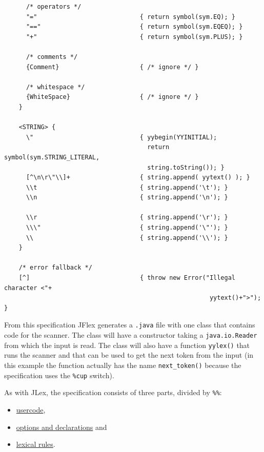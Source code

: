 \begin{verbatim}
      /* operators */
      "="                            { return symbol(sym.EQ); }
      "=="                           { return symbol(sym.EQEQ); }
      "+"                            { return symbol(sym.PLUS); }

      /* comments */
      {Comment}                      { /* ignore */ }
     
      /* whitespace */
      {WhiteSpace}                   { /* ignore */ }
    }

    <STRING> {
      \"                             { yybegin(YYINITIAL); 
                                       return symbol(sym.STRING_LITERAL, 
                                       string.toString()); }
      [^\n\r\"\\]+                   { string.append( yytext() ); }
      \\t                            { string.append('\t'); }
      \\n                            { string.append('\n'); }

      \\r                            { string.append('\r'); }
      \\\"                           { string.append('\"'); }
      \\                             { string.append('\\'); }
    }

    /* error fallback */
    [^]                              { throw new Error("Illegal character <"+
                                                        yytext()+">"); }
\end{verbatim}

From this specification JFlex generates a \texttt{.java} file with one
class that contains code for the scanner. The class will have a
constructor taking a \texttt{java.io.Reader} from which the input is
read. The class will also have a function \texttt{yylex()} that runs the
scanner and that can be used to get the next token from the input (in
this example the function actually has the name \texttt{next\_token()}
because the specification uses the \texttt{\%cup} switch).

As with JLex, the specification consists of three parts, divided by
\texttt{\%\%}:

\begin{itemize}
\itemsep1pt\parskip0pt
\item
  \hyperref[ExampleUserCode]{usercode},
\item
  \hyperref[ExampleOptions]{options and declarations} and
\item
  \hyperref[ExampleLexRules]{lexical rules}.
\end{itemize}

